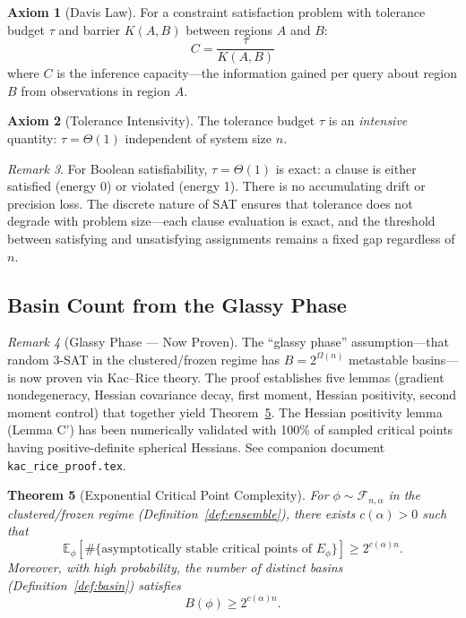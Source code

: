 \documentclass[11pt,a4paper]{article}
\theoremstyle{plain}
\newtheorem{theorem}{Theorem}[section]
\theoremstyle{definition}
\newtheorem{axiom}[theorem]{Axiom}
\theoremstyle{remark}
\newtheorem{remark}[theorem]{Remark}
\newcommand{\E}{\mathbb{E}}
\begin{document}
\begin{axiom}[Davis Law]
\label{ax:davis}
For a constraint satisfaction problem with tolerance budget $\tau$ and barrier $K(A,B)$ between regions $A$ and $B$:
\begin{equation}
    C = \frac{\tau}{K(A,B)}
\end{equation}
where $C$ is the inference capacity---the information gained per query about region $B$ from observations in region $A$.
\end{axiom}

\begin{axiom}[Tolerance Intensivity]
\label{ax:tau}
The tolerance budget $\tau$ is an \emph{intensive} quantity: $\tau = \Theta(1)$ independent of system size $n$.
\end{axiom}

\begin{remark}
For Boolean satisfiability, $\tau = \Theta(1)$ is exact: a clause is either satisfied (energy 0) or violated (energy 1). There is no accumulating drift or precision loss. The discrete nature of SAT ensures that tolerance does not degrade with problem size---each clause evaluation is exact, and the threshold between satisfying and unsatisfying assignments remains a fixed gap regardless of $n$.
\end{remark}

\subsection{Basin Count from the Glassy Phase}

\begin{remark}[Glassy Phase --- Now Proven]
\label{rem:glassy}
The ``glassy phase'' assumption---that random 3-SAT in the clustered/frozen regime has $B = 2^{\Omega(n)}$ metastable basins---is now proven via Kac--Rice theory. The proof establishes five lemmas (gradient nondegeneracy, Hessian covariance decay, first moment, Hessian positivity, second moment control) that together yield Theorem~\ref{thm:crit-complexity}. The Hessian positivity lemma (Lemma C') has been numerically validated with 100\% of sampled critical points having positive-definite spherical Hessians. See companion document \texttt{kac\_rice\_proof.tex}.
\end{remark}

\begin{theorem}[Exponential Critical Point Complexity]
\label{thm:crit-complexity}
For $\phi \sim \mathcal{F}_{n,\alpha}$ in the clustered/frozen regime (Definition~\ref{def:ensemble}), there exists $c(\alpha)>0$ such that
\[
\E_\phi\left[\#\{\text{asymptotically stable critical points of }E_\phi\}\right] \ge 2^{c(\alpha)n}.
\]
Moreover, with high probability, the number of distinct basins (Definition~\ref{def:basin}) satisfies
\[
B(\phi) \ge 2^{c(\alpha)n}.
\]
\end{theorem}
\end{document}
